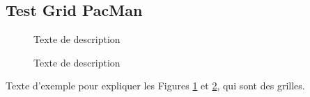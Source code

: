 \documentclass{article}
\begin{document}


\tableofcontents \label{contents}










\subsection{Test Grid PacMan}

\noindent
\begin{figure}[!h]
\caption{Texte de description}
\label{fig:figureExemple}
\end{figure}

\noindent
\begin{figure}[!h]
\caption{Texte de description}
\label{fig:autreFigureExemple}
\end{figure}

Texte d'exemple pour expliquer les Figures \ref{fig:figureExemple} et \ref{fig:autreFigureExemple}, qui sont des grilles.


\end{document}
